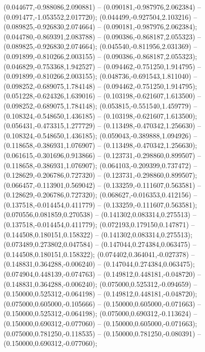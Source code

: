  (0.044677,-0.988086,2.090881) -- (0.090181,-0.987976,2.062384) -- (0.091477,-1.053552,2.017720);
 (0.044499,-0.927504,2.103216) -- (0.089825,-0.926830,2.074664) -- (0.090181,-0.987976,2.062384);
 (0.044780,-0.869391,2.083788) -- (0.090386,-0.868187,2.055323) -- (0.089825,-0.926830,2.074664);
 (0.045540,-0.811956,2.031369) -- (0.091899,-0.810266,2.003155) -- (0.090386,-0.868187,2.055323);
 (0.046829,-0.753368,1.942527) -- (0.094462,-0.751250,1.914795) -- (0.091899,-0.810266,2.003155);
 (0.048736,-0.691543,1.811040) -- (0.098252,-0.689075,1.784148) -- (0.094462,-0.751250,1.914795);
 (0.051228,-0.624326,1.639016) -- (0.103198,-0.621607,1.613500) -- (0.098252,-0.689075,1.784148);
 (0.053815,-0.551540,1.459779) -- (0.108324,-0.548650,1.436185) -- (0.103198,-0.621607,1.613500);
 (0.056431,-0.473315,1.277729) -- (0.113498,-0.470342,1.256630) -- (0.108324,-0.548650,1.436185);
 (0.059043,-0.389888,1.094926) -- (0.118658,-0.386931,1.076907) -- (0.113498,-0.470342,1.256630);
 (0.061615,-0.301696,0.913866) -- (0.123731,-0.298860,0.899507) -- (0.118658,-0.386931,1.076907);
 (0.064103,-0.209399,0.737472) -- (0.128629,-0.206786,0.727320) -- (0.123731,-0.298860,0.899507);
 (0.066457,-0.113901,0.569042) -- (0.133259,-0.111607,0.563581) -- (0.128629,-0.206786,0.727320);
 (0.068627,-0.016353,0.412156) -- (0.137518,-0.014454,0.411779) -- (0.133259,-0.111607,0.563581);
 (0.070556,0.081859,0.270538) -- (0.141302,0.083314,0.275513) -- (0.137518,-0.014454,0.411779);
 (0.072193,0.179150,0.147871) -- (0.144508,0.180151,0.158322) -- (0.141302,0.083314,0.275513);
 (0.073489,0.273802,0.047584) -- (0.147044,0.274384,0.063475) -- (0.144508,0.180151,0.158322);
 (0.074402,0.364041,-0.027378) -- (0.148831,0.364288,-0.006240) -- (0.147044,0.274384,0.063475);
 (0.074904,0.448139,-0.074763) -- (0.149812,0.448181,-0.048720) -- (0.148831,0.364288,-0.006240);
 (0.075000,0.525312,-0.094659) -- (0.150000,0.525312,-0.064198) -- (0.149812,0.448181,-0.048720);
 (0.075000,0.605000,-0.105666) -- (0.150000,0.605000,-0.071663) -- (0.150000,0.525312,-0.064198);
 (0.075000,0.690312,-0.113624) -- (0.150000,0.690312,-0.077060) -- (0.150000,0.605000,-0.071663);
 (0.075000,0.781250,-0.118535) -- (0.150000,0.781250,-0.080391) -- (0.150000,0.690312,-0.077060);
